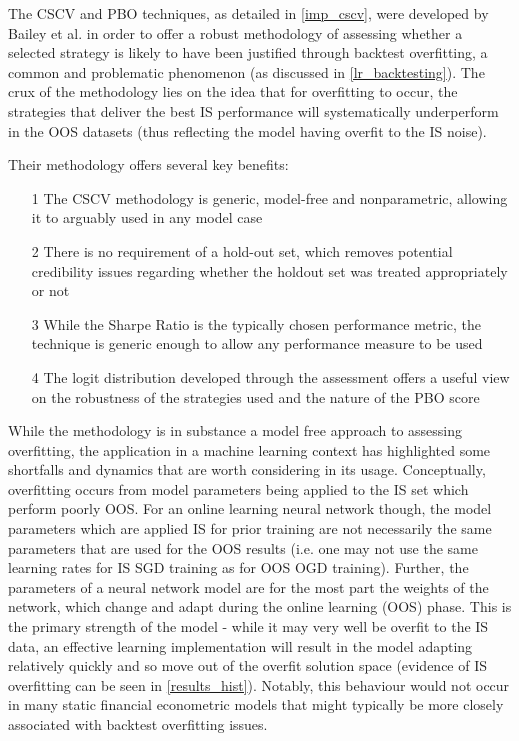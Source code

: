 \documentclass[a4paper,11pt,oneside]{article}
\theoremstyle{plain}
\theoremstyle{definition}
\begin{document}
The CSCV and PBO techniques, as detailed in \ref{imp_cscv}, were developed by Bailey et al. \cite{BailyPBO} in order to offer a robust methodology of assessing whether a selected strategy is likely to have been justified through backtest overfitting, a common and problematic phenomenon (as discussed in \ref{lr_backtesting}). The crux of the methodology lies on the idea that for overfitting to occur, the strategies that deliver the best IS performance will systematically underperform in the OOS datasets (thus reflecting the model having overfit to the IS noise).\newline

Their methodology offers several key benefits:
\begin{itemize}
	\item[1] The CSCV methodology is generic, model-free and nonparametric, allowing it to arguably used in any model case
	\item[2] There is no requirement of a hold-out set, which removes potential credibility issues regarding whether the holdout set was treated appropriately or not
	\item[3] While the Sharpe Ratio is the typically chosen performance metric, the technique is generic enough to allow any performance measure to be used
	\item[4] The logit distribution developed through the assessment offers a useful view on the robustness of the strategies used and the nature of the PBO score
\end{itemize}

\texttt{}\newline
While the methodology is in substance a model free approach to assessing overfitting, the application in a machine learning context has highlighted some shortfalls and dynamics that are worth considering in its usage. Conceptually, overfitting occurs from model parameters being applied to the IS set which perform poorly OOS. For an online learning neural network though, the model parameters which are applied IS for prior training are not necessarily the same parameters that are used for the OOS results (i.e. one may not use the same learning rates for IS SGD training as for OOS OGD training). Further, the parameters of a neural network model are for the most part the weights of the network, which change and adapt during the online learning (OOS) phase. This is the primary strength of the model - while it may very well be overfit to the IS data, an effective learning implementation will result in the model adapting relatively quickly and so move out of the overfit solution space (evidence of IS overfitting can be seen in \ref{results_hist}). Notably, this behaviour would not occur in many static financial econometric models that might typically be more closely associated with backtest overfitting issues.\newline 
\end{document}
